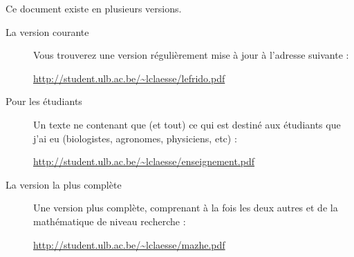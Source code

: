 
\thispagestyle{empty}

Ce document existe en plusieurs versions.
\begin{description}

    \item[La version courante] 

        Vous trouverez une version régulièrement mise à jour à l'adresse suivante :
        \begin{center}
        \url{http://student.ulb.ac.be/~lclaesse/lefrido.pdf}
        \end{center}
        
    \item[Pour les étudiants]

        Un texte ne contenant que (et tout) ce qui est destiné aux étudiants que j'ai eu (biologistes, agronomes, physiciens, etc) :
        \begin{center}
        \url{http://student.ulb.ac.be/~lclaesse/enseignement.pdf}
        \end{center}

    \item[La version la plus complète]

        Une version plus complète, comprenant à la fois les deux autres et de la mathématique de niveau recherche : 
        \begin{center}
        \url{http://student.ulb.ac.be/~lclaesse/mazhe.pdf}
        \end{center}


\end{description}


\vfill

\clearpage
